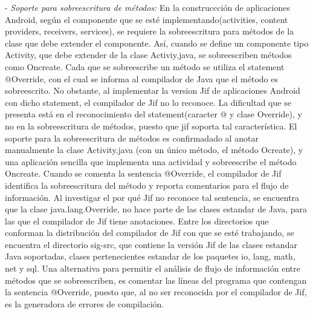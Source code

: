 - \textit{Soporte para sobreescritura de métodos:}\newline 
En la construccción de aplicaciones Android, según el componente que se esté
implementando(activities, content providers, receivers, services), se requiere
la sobreescritura para métodos de la clase que debe extender el componente. Así,
cuando se define un componente tipo Activity, que debe extender de la clase
Activiy.java, se sobreescriben métodos como Oncreate. Cada que se sobreescribe
un método se utiliza el statement @Override, con el cual se informa al
compilador de Java que el método es sobreescrito. No obstante, al implementar la
version Jif de aplicaciones Android con dicho statement, el compilador de Jif
no lo reconoce. La dificultad que se presenta está en el reconocimiento del
statement(caracter @ y clase Override), y no en la sobreescritura de métodos,
puesto que jif soporta tal característica. El soporte para la sobreescritura de
métodos es confirmadado al anotar manualmente la clase Activity.java (con un
único método, el método Ocreate), y una aplicación sencilla que implementa una
actividad y sobreescribe el método Oncreate. Cuando se comenta la sentencia
@Override, el compilador de Jif identifica la sobreescritura del método y
reporta comentarios para el flujo de información.\newline 
Al investigar el por qué Jif no reconoce tal sentencia, se encuentra que la
clase java.lang.Override, no hace parte de las clases estandar de Java, para las
que el compilador de Jif tiene anotaciones.\newline
Entre los directorios que conforman la distribución del compilador de Jif con
que se esté trabajando, se encuentra el directorio sig-src, que contiene la
versión Jif de las clases estandar Java soportadas, clases pertenecientes
estandar de los paquetes io, lang, math, net y sql.\newline 
Una alternativa para permitir el análisis de flujo de información entre métodos
que se sobreescriben, es comentar las líneas del programa que contengan
la sentencia @Override, puesto que, al no ser reconocida por el compilador de
Jif, es la generadora de errores de compilación.

